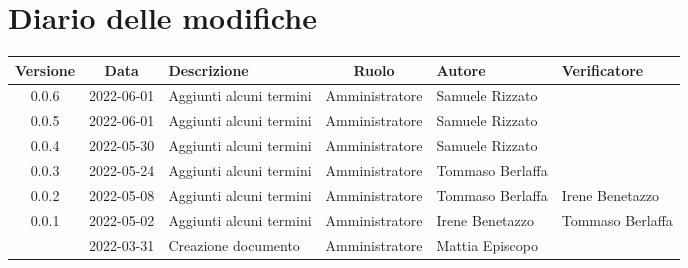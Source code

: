 \section*{Diario delle modifiche}
	\begin{center}
	\renewcommand{\arraystretch}{1.8} %
	\begin{longtable}{ |c|c|p{8em}|c|m{5em}|m{6em}| }
	\hline
	\textbf{Versione} & \textbf{Data} & \textbf{Descrizione} &  \textbf{Ruolo} &  \textbf{Autore} & \textbf{Verificatore}\\ %
	\hline %
	0.0.6 & 2022-06-01 & Aggiunti alcuni termini & Amministratore & Samuele \newline Rizzato & \\
	\hline
	0.0.5 & 2022-06-01 & Aggiunti alcuni termini & Amministratore & Samuele \newline Rizzato & \\
	\hline
	0.0.4 & 2022-05-30 & Aggiunti alcuni termini & Amministratore & Samuele \newline Rizzato & \\
	\hline
	0.0.3 & 2022-05-24 & Aggiunti alcuni termini & Amministratore & Tommaso \newline Berlaffa & \\
	\hline
	0.0.2 & 2022-05-08 & Aggiunti alcuni termini & Amministratore & Tommaso \newline Berlaffa & Irene \newline Benetazzo\\
	\hline
	0.0.1 & 2022-05-02 & Aggiunti alcuni termini & Amministratore & Irene \newline Benetazzo & Tommaso \newline Berlaffa\\
	\hline
  	& 2022-03-31 & Creazione documento & Amministratore & Mattia \newline Episcopo & \\ 
	\hline
	\end{longtable}
	\end{center}
	\newpage